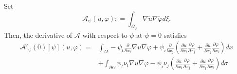 \documentclass[10pt,a4paper]{amsart}
\begin{document}
\begin{lem}\label{lem:Astorto} Set $$
\mathcal{A}_\psi(u,\varphi):
=\int_{\Omega_\psi} \nabla \tilde u\nabla \tilde \varphi d\xi.$$ 
Then, the derivative of $\mathcal{A}$ with respect to $\psi$ at $\psi=0$ satisfies
\begin{eqnarray*}
    \mathcal{A}'_\psi(0)[\psi](u,\varphi)=
&\int_\Omega-\psi_t \frac{\partial}{\partial x_t} \nabla u\nabla \varphi + \psi_i\frac{\partial }{ \partial x_j}\left(\frac{\partial u}{\partial x_i}\frac{\partial \varphi}{\partial x_j}+
\frac{\partial u}{\partial x_j}\frac{\partial \varphi}{\partial x_i}
\right) dx\\
&+\int_{\partial\Omega}\psi_t \nu_t \nabla u\nabla \varphi -
\psi_i \nu_j\left(\frac{\partial u}{\partial x_i}\frac{\partial \varphi}{\partial x_j}+\frac{\partial u}{\partial x_j}\frac{\partial \varphi}{\partial x_i}
\right) d\sigma
\end{eqnarray*} 
\end{lem}
\end{document}
